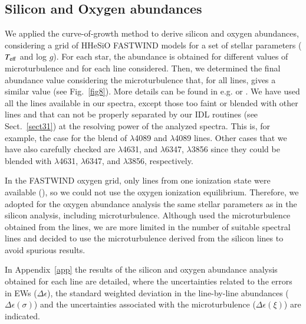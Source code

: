 \documentclass{aa} %
\begin{document}
 



	\subsection{Silicon and Oxygen abundances}\label{sect33}
	
	We applied the curve-of-growth method to derive silicon and oxygen abundances, considering a grid of HHeSiO FASTWIND models for a set of stellar parameters ($T_{\rm eff}$ and log $g$). For each star, the  abundance is obtained for different values of microturbulence and for each line considered. Then, we determined the final abundance value considering the microturbulence that, for all lines, gives a similar value (see Fig.~\ref{fig8}). More details can be found in e.g. \cite{kilian92} or \cite{ssimon10}.	
We have used all the lines available in our spectra, except those too faint or blended with other lines and that can not be properly separated by our IDL routines (see Sect.~\ref{sect31}) at the resolving power of the analyzed spectra. This is, for example, the case for the blend of  $\lambda$4089 and  $\lambda$4089 lines. Other cases that we have also carefully checked are $\lambda$4631, and  $\lambda$6347, $\lambda$3856 since they could be blended with  $\lambda$4631,  $\lambda$6347, and  $\lambda$3856, respectively. 



In the FASTWIND oxygen grid,  only lines from one ionization state were available (), so we could not use the oxygen ionization equilibrium. Therefore, we adopted for the oxygen abundance analysis the same stellar parameters as in the silicon analysis, including microturbulence. Although \cite{ssimon10} used the microturbulence obtained from the  lines, we are more limited in the number of suitable spectral lines and decided to use the microturbulence derived from the silicon lines to avoid spurious results. 

 In Appendix~\ref{app} the results of the silicon and oxygen abundance analysis obtained for each line are detailed, where the uncertainties related to the errors in EWs ($\Delta\epsilon$), the standard weighted deviation in the line-by-line abundances ($\Delta\epsilon(\sigma)$) and the uncertainties associated with the microturbulence ($\Delta\epsilon(\xi)$) are indicated.
\end{document}
